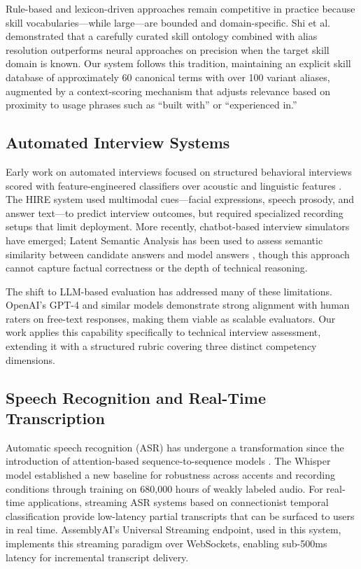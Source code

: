\documentclass[conference]{IEEEtran}
\begin{document}
Rule-based and lexicon-driven approaches remain competitive in practice because skill vocabularies—while large—are bounded and domain-specific. Shi et al.\ \cite{shi2023recruitpro} demonstrated that a carefully curated skill ontology combined with alias resolution outperforms neural approaches on precision when the target skill domain is known. Our system follows this tradition, maintaining an explicit skill database of approximately 60 canonical terms with over 100 variant aliases, augmented by a context-scoring mechanism that adjusts relevance based on proximity to usage phrases such as ``built with'' or ``experienced in.''

\subsection{Automated Interview Systems}

Early work on automated interviews focused on structured behavioral interviews scored with feature-engineered classifiers over acoustic and linguistic features \cite{naous2022automated}. The HIRE system \cite{yang2021automated} used multimodal cues—facial expressions, speech prosody, and answer text—to predict interview outcomes, but required specialized recording setups that limit deployment. More recently, chatbot-based interview simulators have emerged; Latent Semantic Analysis has been used to assess semantic similarity between candidate answers and model answers \cite{papineni2002bleu}, though this approach cannot capture factual correctness or the depth of technical reasoning.

The shift to LLM-based evaluation has addressed many of these limitations. OpenAI's GPT-4 \cite{openai2023gpt4} and similar models demonstrate strong alignment with human raters on free-text responses, making them viable as scalable evaluators. Our work applies this capability specifically to technical interview assessment, extending it with a structured rubric covering three distinct competency dimensions.

\subsection{Speech Recognition and Real-Time Transcription}

Automatic speech recognition (ASR) has undergone a transformation since the introduction of attention-based sequence-to-sequence models \cite{vaswani2017attention}. The Whisper model \cite{radford2023whisper} established a new baseline for robustness across accents and recording conditions through training on 680,000 hours of weakly labeled audio. For real-time applications, streaming ASR systems based on connectionist temporal classification \cite{graves2006ctc} provide low-latency partial transcripts that can be surfaced to users in real time. AssemblyAI's Universal Streaming endpoint, used in this system, implements this streaming paradigm over WebSockets, enabling sub-500ms latency for incremental transcript delivery.
\end{document}
